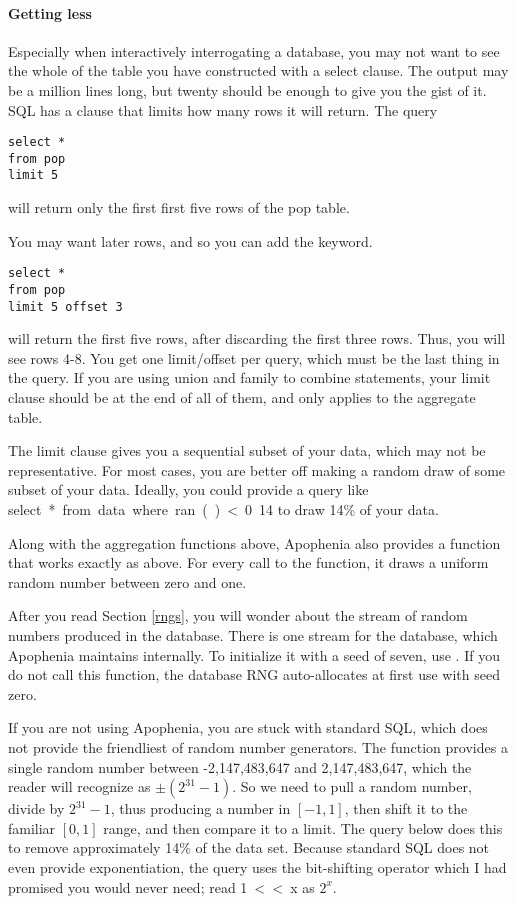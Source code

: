 
\paragraph{Getting less} 
Especially when interactively interrogating a database, you may not want
to see the whole of the table you have constructed with a \si{select}
clause. The output may be a million lines long, but twenty should be
enough to give you the gist of it. SQL has a  clause that
limits how many rows it will return. The query
\begin{lstlisting}
select * 
from pop
limit 5
\end{lstlisting}
will return only the first first five rows of the \si{pop} table.

You may want later rows, and so you can add the  keyword.
\begin{lstlisting}
select * 
from pop
limit 5 offset 3
\end{lstlisting}
will return the first five rows, after discarding the first three rows.
Thus, you will see rows 4-8. You get one \si{limit}/\si{offset} per
query, which must be the last thing in the query. If you are using \si{union}
and family to combine  statements, your \si{limit} clause
should be at the end of all of them, and only applies to the aggregate
table.

The \si{limit} clause gives you a sequential subset of your data, which
may not be representative. For most cases, you are better off making a
random draw of some subset of your data. Ideally, you could provide a
query like \si{select * from data where ran() < 0.14} to draw 14\% of
your data.

Along with the aggregation functions above, Apophenia also provides a
 function that works exactly as above. For every call to the
function, it draws  a uniform random number between zero and one.

After you read Section \ref{rngs}, you will wonder about the stream of
random numbers produced in the database. There is one stream for the
database, which Apophenia maintains internally. To initialize it with
a seed of seven, use . If you do not
call this function, the database RNG auto-allocates at first use with
seed zero.

If you are not using Apophenia, you are stuck with standard SQL, which
does not provide the friendliest of random number generators. The
 function provides a single random number between
-2,147,483,647 and 2,147,483,647, which the reader will recognize as
$\pm (2^{31}-1)$. So we need to pull a random number, divide by $2^{31}-1$,
thus producing a number in $[-1,1]$, then shift it to the familiar $[0,1]$
range, and then compare it to a limit. The query below does this to remove
approximately 14\% of the data set. Because standard SQL does not even
provide exponentiation, the query uses the bit-shifting operator
which I had promised you would never need; read \si{1<<x} as $2^x$.

